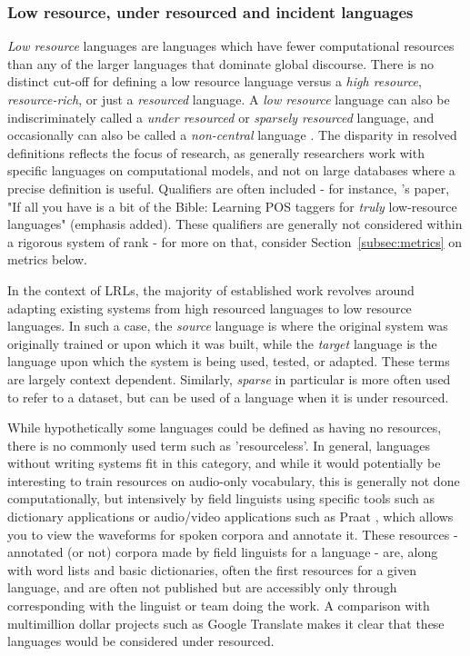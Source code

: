 \subsubsection{Low resource, under resourced and incident languages}

\textit{Low resource} languages are languages which have fewer computational resources than any of the larger languages that dominate global discourse. There is no distinct cut-off for defining a low resource language versus a \textit{high resource}, \textit{resource-rich}, or just a \textit{resourced} language. A \textit{low resource} language can also be indiscriminately called a \textit{under resourced} or \textit{sparsely resourced} language, and occasionally can also be called a {\it non-central} language \citep{streiter2006implementing}. The disparity in resolved definitions reflects the focus of research, as generally researchers work with specific languages on computational models, and not on large databases where a precise definition is useful. Qualifiers are often included - for instance, \citet{agic2015if}'s paper, "If all you have is a bit of the Bible: Learning POS taggers for {\it truly} low-resource languages" (emphasis added). These qualifiers are generally not considered within a rigorous system of rank - for more on that, consider Section~\ref{subsec:metrics} on metrics below.

In the context of LRLs, the majority of established work revolves around adapting existing systems from high resourced languages to low resource languages. In such a case, the \textit{source} language is where the original system was originally trained or upon which it was built, while the \textit{target} language is the language upon which the system is being used, tested, or adapted. These terms are largely context dependent. Similarly, \textit{sparse} in particular is more often used to refer to a dataset, but can be used of a language when it is under resourced.

While hypothetically some languages could be defined as having no resources, there is no commonly used term such as 'resourceless'. In general, languages without writing systems fit in this category, and while it would potentially be interesting to train resources on audio-only vocabulary, this is generally not done computationally, but intensively by field linguists using specific tools such as dictionary applications or audio/video applications such as Praat \citep{boersma2009praat}, which allows you to view the waveforms for spoken corpora and annotate it. These resources - annotated (or not) corpora made by field linguists for a language - are, along with word lists and basic dictionaries, often the first resources for a given language, and are often not published but are accessibly only through corresponding with the linguist or team doing the work. A comparison with multimillion dollar projects such as Google Translate makes it clear that these languages would be considered under resourced.

